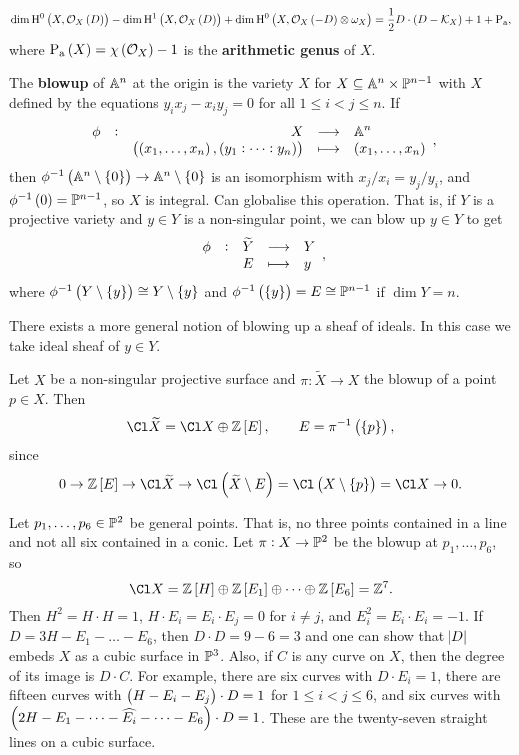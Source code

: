 \begin{theorem}
$$ \dim \H^0\br{X, \OOO_X\br{D}} - \dim \H^1\br{X, \OOO_X\br{D}} + \dim \H^0\br{X, \OOO_X\br{-D} \otimes \omega_X} = \dfrac{1}{2}D \cdot \br{D - \KKK_X} + 1 + \P_\a, $$
where $ \P_\a\br{X} = \chi\br{\OOO_X} - 1 $ is the \textbf{arithmetic genus} of $ X $.
\end{theorem}

\pagebreak

The \textbf{blowup} of $ \AA^n $ at the origin is the variety $ X $ for $ X \subseteq \AA^n \times \PP^{n - 1} $ with $ X $ defined by the equations $ y_ix_j - x_iy_j = 0 $ for all $ 1 \le i < j \le n $. If
$$ \function[\phi]{X}{\AA^n}{\br{\br{x_1, \dots, x_n}, \br{y_1 : \dots : y_n}}}{\br{x_1, \dots, x_n}}, $$
then $ \phi^{-1}\br{\AA^n \setminus \cbr{0}} \to \AA^n \setminus \cbr{0} $ is an isomorphism with $ x_j / x_i = y_j / y_i $, and $ \phi^{-1}\br{0} = \PP^{n - 1} $, so $ X $ is integral. Can globalise this operation. That is, if $ Y $ is a projective variety and $ y \in Y $ is a non-singular point, we can blow up $ y \in Y $ to get
$$ \function[\phi]{\widetilde{Y}}{Y}{E}{y}, $$
where $ \phi^{-1}\br{Y \setminus \cbr{y}} \cong Y \setminus \cbr{y} $ and $ \phi^{-1}\br{\cbr{y}} = E \cong \PP^{n - 1} $ if $ \dim Y = n $.

\begin{remark*}
There exists a more general notion of blowing up a sheaf of ideals. In this case we take ideal sheaf of $ y \in Y $.
\end{remark*}

Let $ X $ be a non-singular projective surface and $ \pi : \widetilde{X} \to X $ the blowup of a point $ p \in X $. Then
$$ \Cl \widetilde{X} = \Cl X \oplus \ZZ\sbr{E}, \qquad E = \pi^{-1}\br{\cbr{p}}, $$
since
$$ 0 \to \ZZ\sbr{E} \to \Cl \widetilde{X} \to \Cl \br{\widetilde{X} \setminus E} = \Cl \br{X \setminus \cbr{p}} = \Cl X \to 0. $$

\begin{example*}
Let $ p_1, \dots, p_6 \in \PP^2 $ be general points. That is, no three points contained in a line and not all six contained in a conic. Let $ \pi : X \to \PP^2 $ be the blowup at $ p_1, \dots, p_6 $, so
$$ \Cl X = \ZZ\sbr{H} \oplus \ZZ\sbr{E_1} \oplus \dots \oplus \ZZ\sbr{E_6} = \ZZ^7. $$
Then $ H^2 = H \cdot H = 1 $, $ H \cdot E_i = E_i \cdot E_j = 0 $ for $ i \ne j $, and $ E_i^2 = E_i \cdot E_i = -1 $. If $ D = 3H - E_1 - \dots - E_6 $, then $ D \cdot D = 9 - 6 = 3 $ and one can show that $ \abs{D} $ embeds $ X $ as a cubic surface in $ \PP^3 $. Also, if $ C $ is any curve on $ X $, then the degree of its image is $ D \cdot C $. For example, there are six curves with $ D \cdot E_i = 1 $, there are fifteen curves with $ \br{H - E_i - E_j} \cdot D = 1 $ for $ 1 \le i < j \le 6 $, and six curves with $ \br{2H - E_1 - \dots - \widehat{E_i} - \dots - E_6} \cdot D = 1 $. These are the twenty-seven straight lines on a cubic surface.
\end{example*}

